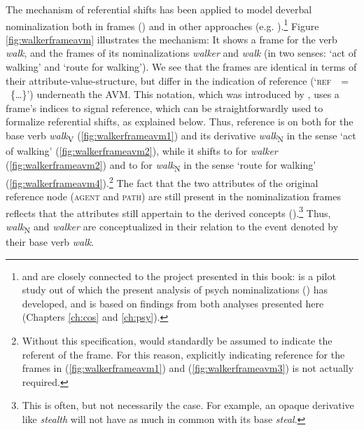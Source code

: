 The mechanism of referential shifts has been applied to model deverbal nominalization both in frames (\citealt{Loebner.2013,Schulzek.2014,Kawaletz.2015,Plag.2018,Schulzek.forthcoming}) and in other approaches (e.g. \citealt{Panther.2002}).\footnote{\citet{Kawaletz.2015} and \citet{Plag.2018} are closely connected to the project presented in this book: \citet{Kawaletz.2015} is a pilot study out of which the present analysis of psych nominalizations () has developed, and \citet{Plag.2018} is based on findings from both analyses presented here (Chapters \ref{ch:cos} and \ref{ch:psy}).} 
Figure \ref{fig:walkerframeavm} illustrates the mechanism: It shows a frame for the verb \textit{walk}, and the frames of its nominalizations \textit{walker} and \textit{walk} (in two senses: `act of walking' and `route for walking'). We see that the frames are identical in terms of their attribute-value-structure, but differ in the indication of reference \mbox{(`\textsc{ref} $~=~$ \{\dots\}')} underneath the AVM. This notation, which was introduced by \citet{Plag.2018}, uses a frame's indices to signal reference, which can be straightforwardly used to formalize referential shifts, as explained below. Thus, reference is on  both for the base verb \textit{walk}\textsubscript{V} (\ref{fig:walkerframeavm1}) and its derivative \textit{walk}\textsubscript{N} in the sense `act of walking' (\ref{fig:walkerframeavm2}), while it shifts to  for \textit{walker}  (\ref{fig:walkerframeavm2}) and to  for \textit{walk}\textsubscript{N} in the sense `route for walking' (\ref{fig:walkerframeavm4}).\footnote{Without this specification,  would standardly be assumed to indicate the referent of the frame. For this reason, explicitly indicating reference for the frames in (\ref{fig:walkerframeavm1}) and (\ref{fig:walkerframeavm3}) is not actually required.} 
The fact that the two attributes of the original reference node (\textsc{agent} and \textsc{path}) are still present in the nominalization frames reflects that the attributes still appertain to the derived concepts (\citealt[313]{Loebner.2013}).\footnote{This is often, but not necessarily the case. For example, an opaque derivative like \textit{stealth} will not have as much in common with its base \textit{steal}.} Thus, \textit{walk}\textsubscript{N} and \textit{walker} are conceptualized in their relation to the event denoted by their base verb \textit{walk}.

